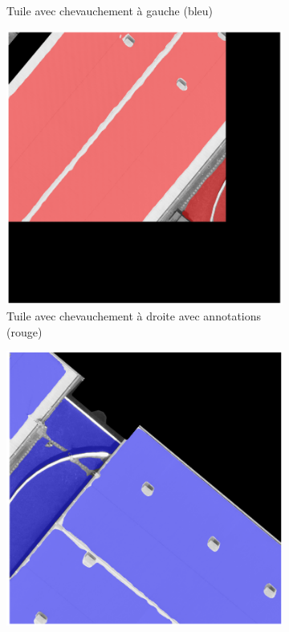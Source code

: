 \begin{figure}[H]
\begin{subfigure}[b]{0.49\textwidth}
        \caption{Tuile avec chevauchement à gauche (bleu)}
        \label{fig:ch3_postprocessing_dataset_09_validation_chevauchement_droite2}
    \end{subfigure}
    \begin{subfigure}[b]{0.49\textwidth}
        \centering
        \includegraphics[width=\textwidth]{02-main/figures/ch3/ch3_postprocessing_dataset_10_validation_chevauchement_droite3.png}
        \caption{Tuile avec chevauchement à droite avec annotations (rouge)}
        \label{fig:ch3_postprocessing_dataset_10_validation_chevauchement_droite3}
    \end{subfigure}
    \hfill
    \begin{subfigure}[b]{0.49\textwidth}
        \centering
        \includegraphics[width=\textwidth]{02-main/figures/ch3/ch3_postprocessing_dataset_11_validation_chevauchement_droite4.png}

\end{subfigure}
\end{figure}

